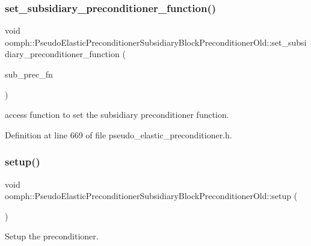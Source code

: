 \subsubsection{\texorpdfstring{set\+\_\+subsidiary\+\_\+preconditioner\+\_\+function()}{set\_subsidiary\_preconditioner\_function()}}
{\footnotesize\ttfamily void oomph\+::\+Pseudo\+Elastic\+Preconditioner\+Subsidiary\+Block\+Preconditioner\+Old\+::set\+\_\+subsidiary\+\_\+preconditioner\+\_\+function (\begin{DoxyParamCaption}\item[{\hyperlink{classoomph_1_1PseudoElasticPreconditionerSubsidiaryBlockPreconditionerOld_a85f57923e70244d5fde0538946eb8c3d}{Subsidiary\+Preconditioner\+Fct\+Pt}}]{sub\+\_\+prec\+\_\+fn }\end{DoxyParamCaption})\hspace{0.3cm}{\ttfamily [inline]}}



access function to set the subsidiary preconditioner function. 



Definition at line 669 of file pseudo\+\_\+elastic\+\_\+preconditioner.\+h.

\mbox{\label{classoomph_1_1PseudoElasticPreconditionerSubsidiaryBlockPreconditionerOld_a4477e968641690ab5c66c8155aef8a99}} 
\subsubsection{\texorpdfstring{setup()}{setup()}}
{\footnotesize\ttfamily void oomph\+::\+Pseudo\+Elastic\+Preconditioner\+Subsidiary\+Block\+Preconditioner\+Old\+::setup (\begin{DoxyParamCaption}{ }\end{DoxyParamCaption})\hspace{0.3cm}{\ttfamily [virtual]}}



Setup the preconditioner. 



